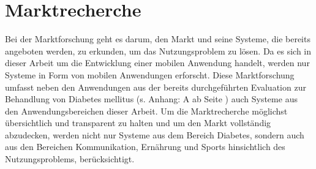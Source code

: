 \section{Marktrecherche}
	Bei der Marktforschung geht es darum, den Markt und seine Systeme, die bereits angeboten werden, zu erkunden, um das Nutzungsproblem zu lösen. Da es sich in dieser Arbeit um die Entwicklung einer mobilen Anwendung handelt, werden nur Systeme in Form von mobilen Anwendungen erforscht. Diese Marktforschung umfasst neben den Anwendungen aus der bereits durchgeführten Evaluation zur Behandlung von Diabetes mellitus (s. Anhang: A  ab Seite \pageref{section:Evaluation}) auch Systeme aus den Anwendungsbereichen dieser Arbeit. Um die Marktrecherche möglichst übersichtlich und transparent zu halten und um den Markt vollständig abzudecken, werden nicht nur Systeme aus dem Bereich Diabetes, sondern auch aus den Bereichen Kommunikation, Ernährung und Sports hinsichtlich des Nutzungsproblems, berücksichtigt.
